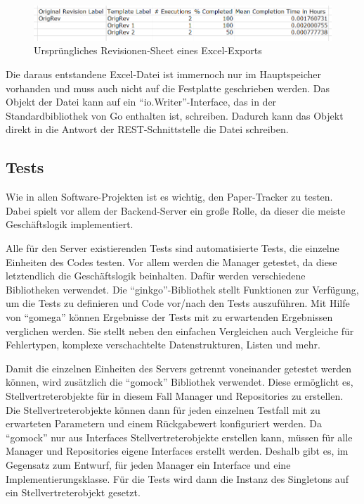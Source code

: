 \begin{figure}[htbp]
	\includegraphics[width=\textwidth]{images/export_orig_revisions.png}
	\centering
	\caption{Ursprüngliches Revisionen-Sheet eines Excel-Exports}
	\label{fig:export-orig-revisions}
\end{figure}

Die daraus entstandene Excel-Datei ist immernoch nur im Hauptspeicher vorhanden
und muss auch nicht auf die Festplatte geschrieben werden.
Das Objekt der Datei kann auf ein \enquote{io.Writer}-Interface,
das in der Standardbibliothek von Go enthalten ist, schreiben.
Dadurch kann das Objekt direkt in die Antwort der \gls{REST}-Schnittstelle die Datei schreiben.

\subsection{Tests}

Wie in allen Software-Projekten ist es wichtig, den Paper-Tracker zu testen.
Dabei spielt vor allem der Backend-Server ein große Rolle, da dieser die meiste Geschäftslogik implementiert.

Alle für den Server existierenden Tests sind automatisierte Tests, die einzelne Einheiten des Codes testen.
Vor allem werden die Manager getestet, da diese letztendlich die Geschäftslogik beinhalten.
Dafür werden verschiedene Bibliotheken verwendet.
Die \enquote{ginkgo}-Bibliothek stellt Funktionen zur Verfügung, um die Tests zu definieren
und Code vor/nach den Tests auszuführen.
Mit Hilfe von \enquote{gomega} können Ergebnisse der Tests mit zu erwartenden Ergebnissen verglichen werden.
Sie stellt neben den einfachen Vergleichen auch Vergleiche für Fehlertypen, komplexe verschachtelte Datenstrukturen,
Listen und mehr.

Damit die einzelnen Einheiten des Servers getrennt voneinander getestet werden können, wird zusätzlich die
\enquote{gomock} Bibliothek verwendet.
Diese ermöglicht es, Stellvertreterobjekte für in diesem Fall Manager und Repositories zu erstellen.
Die Stellvertreterobjekte können dann für jeden einzelnen Testfall mit zu erwarteten Parametern und einem Rückgabewert
konfiguriert werden.
Da \enquote{gomock} nur aus Interfaces Stellvertreterobjekte erstellen kann, müssen für alle Manager
und Repositories eigene Interfaces erstellt werden.
Deshalb gibt es, im Gegensatz zum Entwurf, für jeden Manager ein Interface und eine Implementierungsklasse.
Für die Tests wird dann die Instanz des Singletons auf ein Stellvertreterobjekt gesetzt.

